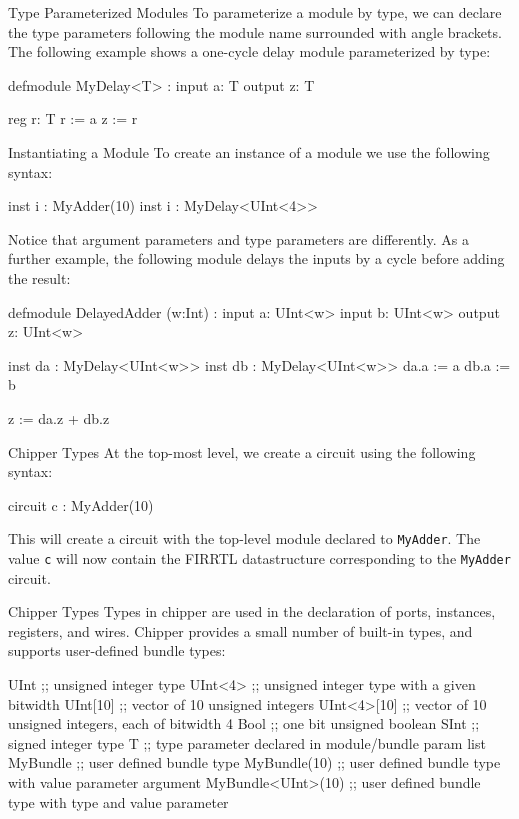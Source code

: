 \documentclass[xcolor=pdflatex,dvipsnames,table]{beamer}
\begin{document}
\begin{frame}[fragile]{Type Parameterized Modules}
To parameterize a module by type, we can declare the type parameters following the module name surrounded with angle brackets. The following example shows a one-cycle delay module parameterized by type:
\begin{stanza}
defmodule MyDelay<T> :
   input a: T
   output z: T

   reg r: T
   r := a
   z := r
\end{stanza}
\end{frame}

\begin{frame}[fragile]{Instantiating a Module}
To create an instance of a module we use the following syntax:
\begin{stanza}
inst i : MyAdder(10)
inst i : MyDelay<UInt<4>>
\end{stanza}

Notice that argument parameters and type parameters are differently. As a further example, the following module delays the inputs by a cycle before adding the result:
\begin{stanza}
defmodule DelayedAdder (w:Int) :
   input a: UInt<w>
   input b: UInt<w>
   output z: UInt<w>

   inst da : MyDelay<UInt<w>>
   inst db : MyDelay<UInt<w>>
   da.a := a
   db.a := b

   z := da.z + db.z
\end{stanza}
\end{frame}

\begin{frame}[fragile]{Chipper Types}
At the top-most level, we create a circuit using the following syntax:
\begin{stanza}
circuit c : MyAdder(10)
\end{stanza}
\noindent
This will create a circuit with the top-level module declared to \verb+MyAdder+. The value \verb+c+ will now contain the FIRRTL datastructure corresponding to the \verb+MyAdder+ circuit.
\end{frame}

\begin{frame}[fragile]{Chipper Types}
Types in chipper are used in the declaration of ports, instances, registers, and wires. Chipper provides a small number of built-in types, and supports user-defined bundle types:
\begin{stanza}
UInt               ;; unsigned integer type
UInt<4>            ;; unsigned integer type with a given bitwidth
UInt[10]           ;; vector of 10 unsigned integers
UInt<4>[10]        ;; vector of 10 unsigned integers, each of bitwidth 4
Bool               ;; one bit unsigned boolean
SInt               ;; signed integer type
T                  ;; type parameter declared in module/bundle param list
MyBundle           ;; user defined bundle type
MyBundle(10)       ;; user defined bundle type with value parameter argument
MyBundle<UInt>(10) ;; user defined bundle type with type and value parameter
\end{stanza}
\end{frame}
\end{document}

